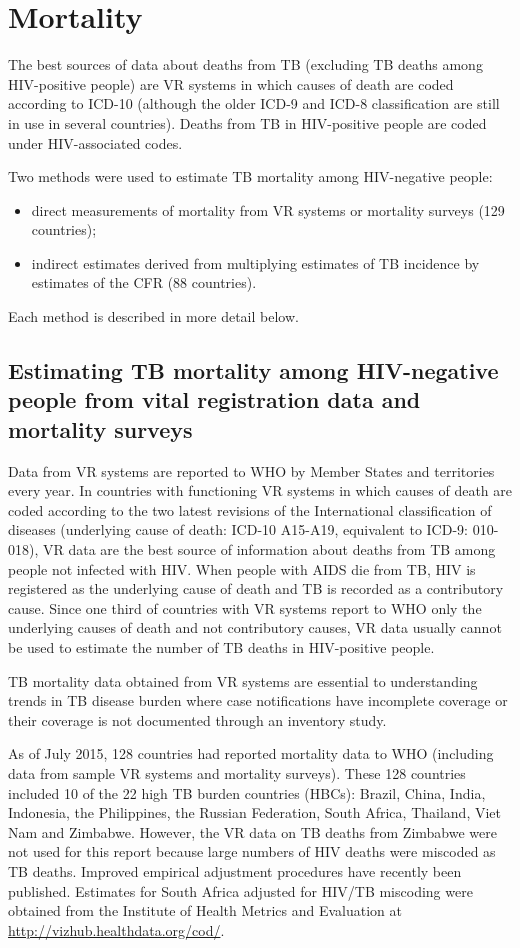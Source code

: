 \section{Mortality}

The best sources of data about deaths from TB (excluding TB deaths among HIV-positive people) are VR systems in which causes of death are coded according to ICD-10 (although the older ICD-9 and ICD-8 classification are still in use in several countries). Deaths from TB in HIV-positive people are coded under HIV-associated codes. 

Two methods were used to estimate TB mortality among HIV-negative people: 
\begin{itemize}
\item direct measurements of mortality from VR systems or mortality surveys (129 countries);
\item indirect estimates derived from multiplying estimates of TB incidence by estimates of the CFR (88 countries). 
\end{itemize}

Each method is described in more detail below. 

\subsection{Estimating TB mortality among HIV-negative people from vital registration data and mortality surveys}

Data from VR systems are reported to WHO by Member States and territories every year. In countries with functioning VR systems in which causes of death are coded according to the two latest revisions of the International classification of diseases (underlying cause of death: ICD-10 A15-A19, equivalent to ICD-9: 010-018), VR data are the best source of information about deaths from TB among people not infected with HIV. When people with AIDS die from TB, HIV is registered as the underlying cause of death and TB is recorded as a contributory cause. Since one third of countries with VR systems report to WHO only the underlying causes of death and not contributory causes, VR data usually cannot be used to estimate the number of TB deaths in HIV-positive people. 

TB mortality data obtained from VR systems are essential to understanding trends in TB disease burden where case notifications have incomplete coverage or their coverage is not documented through an inventory study. 

As of July 2015, 128 countries had reported mortality data to WHO (including data from sample VR systems and mortality surveys). These 128 countries included 10 of the 22 high TB burden countries (HBCs): Brazil, China, India, Indonesia, the Philippines, the Russian Federation, South Africa, Thailand, Viet Nam and Zimbabwe. However, the VR data on TB deaths from Zimbabwe were not used for this report because large numbers of HIV deaths were miscoded as TB deaths. Improved empirical adjustment procedures have recently been published\cite{21479092}. Estimates for South Africa adjusted for HIV/TB miscoding were obtained from the Institute of Health Metrics and Evaluation at \url{http://vizhub.healthdata.org/cod/}. 

